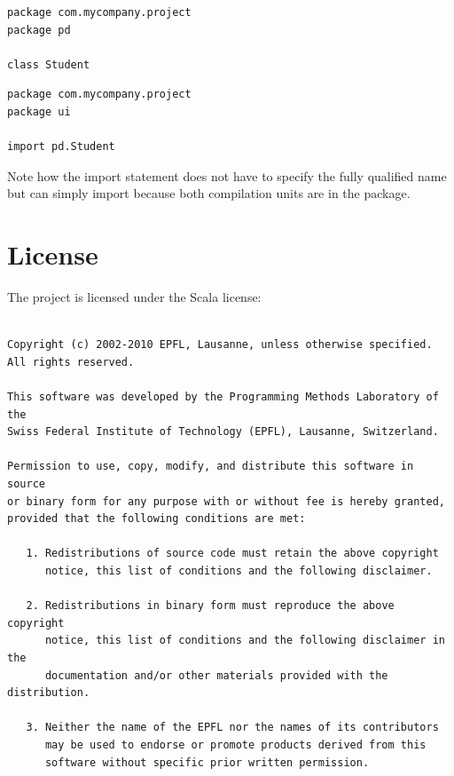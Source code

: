 \documentclass[10pt,a4paper,oneside]{scrreprt}
\begin{document}
{
\begin{lstlisting}
package com.mycompany.project
package pd

class Student
\end{lstlisting}

\begin{lstlisting}
package com.mycompany.project
package ui

import pd.Student
\end{lstlisting}

Note how the import statement does not have to specify the fully qualified name but can simply import  because both compilation units are in the  package.

\label{end-chapter:advanced-scala-features}

\chapter{License} \label{chapter:scala-license}

The project is licensed under the Scala license:

\begin{small}\begin{verbatim}

Copyright (c) 2002-2010 EPFL, Lausanne, unless otherwise specified.
All rights reserved.

This software was developed by the Programming Methods Laboratory of the
Swiss Federal Institute of Technology (EPFL), Lausanne, Switzerland.

Permission to use, copy, modify, and distribute this software in source
or binary form for any purpose with or without fee is hereby granted,
provided that the following conditions are met:

   1. Redistributions of source code must retain the above copyright
      notice, this list of conditions and the following disclaimer.

   2. Redistributions in binary form must reproduce the above copyright
      notice, this list of conditions and the following disclaimer in the
      documentation and/or other materials provided with the distribution.

   3. Neither the name of the EPFL nor the names of its contributors
      may be used to endorse or promote products derived from this
      software without specific prior written permission.



\end{verbatim}
\end{small}}
\end{document}

